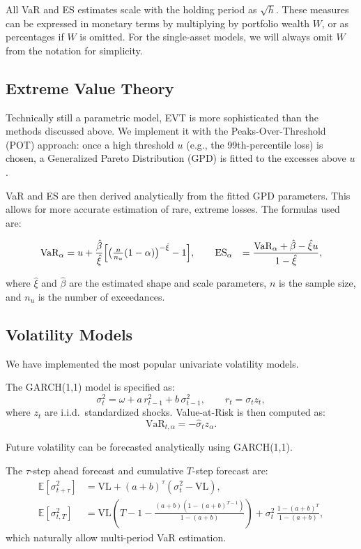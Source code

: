 \documentclass{article}
\begin{document}
All VaR and ES estimates scale with the holding period as $\sqrt{h}$. These measures can be expressed in monetary terms by multiplying by portfolio wealth $W$, or as percentages if $W$ is omitted. For the single-asset models, we will always omit $W$ from the notation for simplicity.



\subsection{Extreme Value Theory}


Technically still a parametric model, EVT is more sophisticated than the methods discussed above. We implement it with the Peaks-Over-Threshold (POT) approach: once a high threshold $u$ (e.g., the 99th-percentile loss) is chosen, a Generalized Pareto Distribution (GPD) is fitted to the excesses above $u$. 

VaR and ES are then derived analytically from the fitted GPD parameters. This allows for more accurate estimation of rare, extreme losses. The formulas used are:

\[
\begin{aligned}
{\text{VaR}}_\alpha &= u + \frac{\hat{\beta}}{\hat{\xi}}
\Bigl[\bigl(\tfrac{n}{n_u}(1-\alpha)\bigr)^{-\hat{\xi}} - 1\Bigr],\qquad
{\text{ES}}_\alpha &= \frac{{\text{VaR}}_\alpha + \hat{\beta} - \hat{\xi} u}{1 - \hat{\xi}},
\end{aligned}
\]

where $\hat{\xi}$ and $\hat{\beta}$ are the estimated shape and scale parameters, $n$ is the sample size, and $n_u$ is the number of exceedances.


\subsection{Volatility Models}

We have implemented the most popular univariate volatility models.

The GARCH(1,1) model is specified as:
\[
  \sigma_t^2 = \omega + a\, r_{t-1}^2 + b\, \sigma_{t-1}^2, \qquad r_t = \sigma_t z_t,
\]
where \( z_t \) are i.i.d.\ standardized shocks. Value-at-Risk is then computed as:
\[
  \text{VaR}_{t,\alpha} = -\hat{\sigma}_t z_\alpha.
\]

Future volatility can be forecasted analytically using GARCH(1,1).

The \( \tau \)-step ahead forecast and cumulative \( T \)-step forecast are:
\begin{align*}
  \mathbb{E}[\sigma_{t+\tau}^2] &= \mathrm{VL} + (a + b)^\tau(\sigma_t^2 - \mathrm{VL}),  \\  
  \mathbb{E}[\sigma_{t,T}^2] &= \mathrm{VL}\left(T - 1 - \frac{(a + b)(1 - (a + b)^{T - 1})}{1 - (a + b)}\right)
    + \sigma_t^2\, \frac{1 - (a + b)^T}{1 - (a + b)},
\end{align*}
which naturally allow multi-period VaR estimation.
\end{document}
